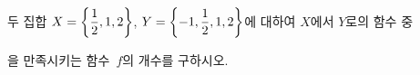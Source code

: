 두 집합 $X=\left\{\dfrac{1}{2}{,}\mkern3mu\mathopen{}1{,}\mkern3mu\mathopen{}2\right\}$, $Y=\left\{-1{,}\mkern3mu\mathopen{}\dfrac{1}{2}{,}\mkern3mu\mathopen{}1{,}\mkern3mu\mathopen{}2\right\}$에 대하여 $X$에서 $Y$로의 함수 중\par\smallskip{}\par\smallskip\noindent 을 만족시키는 함수~$f$의 개수를 구하시오.

